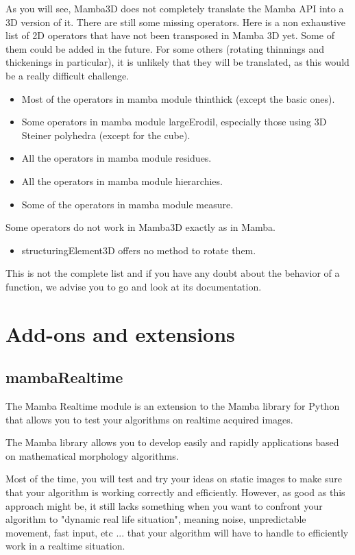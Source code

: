 \documentclass[a4paper,10pt,oneside]{article}
\begin{document}
As you will see, Mamba3D does not completely translate the Mamba API into
a 3D version of it. There are still some missing operators. Here is a non
exhaustive list of 2D operators that have not been transposed in Mamba 3D yet.
Some of them could be added in the future. For some others (rotating thinnings
and thickenings in particular), it is unlikely that they will be translated, as
this would be a really difficult challenge.

\begin{itemize}
\item Most of the operators in mamba module thinthick (except the basic ones).
\item Some operators in mamba module largeErodil, especially those using 3D Steiner polyhedra (except
for the cube).
\item All the operators in mamba module residues.
\item All the operators in mamba module hierarchies.
\item Some of the operators in mamba module measure.
\end{itemize}

Some operators do not work in Mamba3D exactly as in Mamba.

\begin{itemize}
\item structuringElement3D offers no method to rotate them.
\end{itemize}

This is not the complete list and if you have any doubt about the behavior
of a function, we advise you to go and look at its documentation.

\pagebreak

\section{Add-ons and extensions}
\subsection{mambaRealtime}

The Mamba Realtime module is an extension to the Mamba library for Python that 
allows you to test your algorithms on realtime acquired images.

The Mamba library allows you to develop easily and rapidly applications based on 
mathematical morphology algorithms. 

Most of the time, you will test and try your ideas on static images to make sure 
that your algorithm is working correctly and efficiently. However, as good as 
this approach might be, it still lacks something when you want to confront your 
algorithm to "dynamic real life situation", meaning noise, unpredictable 
movement, fast input, etc ... that your algorithm will have to handle to 
efficiently work in a realtime situation.
\end{document}
